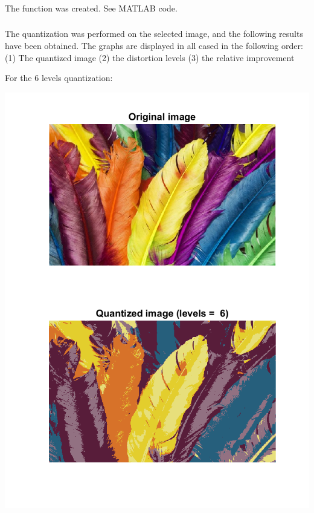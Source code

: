 \documentclass[a4paper]{iacas}
\begin{document}
\subsubsection{}
The function was created. See MATLAB code.

\subsubsection{}
The quantization was performed on the selected image, and the following results have been obtained. The graphs are displayed in all cased in the following order: (1) The quantized image (2) the distortion levels (3) the relative improvement

For the 6 levels quantization:

\vskip 0.1in
\begin{minipage}{1\textwidth}
\centering
	\includegraphics[scale=0.9]{../imgs/imgs_q4/q4_quantized_levels_6_init_1.png}
\end{minipage}
\vskip 0.1in
\end{document}

